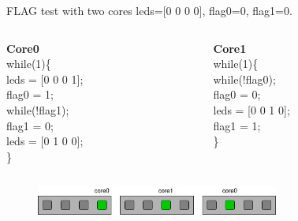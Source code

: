 \begin{frame}{FLAG test with two cores}
leds=[0 0 0 0], flag0=0, flag1=0.
  \begin{columns}[T]
    \begin{column}{0.4\textwidth}
        \textbf{Core0}\\
        while(1)\{\\
        \hspace{1cm}leds = [0 0 0 1];\\
        \hspace{1cm}flag0 = 1;\\
        \hspace{1cm}while(!flag1);\\
        \hspace{1cm}flag1 = 0;\\
        \hspace{1cm}leds = [0 1 0 0];\\
        \}
    \end{column}
    \begin{column}{0.4\textwidth}
        \textbf{Core1}\\
        while(1)\{\\
        \hspace{1cm}while(!flag0);\\
        \hspace{1cm}flag0 = 0;\\
        \hspace{1cm}leds = [0 0 1 0];\\
        \hspace{1cm}flag1 = 1;\\
        \}
    \end{column}
 \end{columns}
 \begin{figure}
    \centering
    \includegraphics[width=8cm]{images/leds2_fig.png}
    \label{fig:my_label}
\end{figure}
\end{frame}

%

